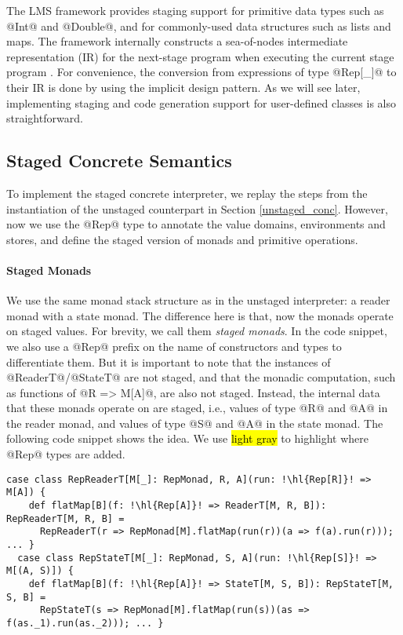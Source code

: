 The LMS framework provides staging support for primitive data types such as
@Int@ and @Double@, and for commonly-used data structures such as lists and
maps.  The framework internally constructs a sea-of-nodes intermediate
representation (IR) for the next-stage program when executing the current stage
program \cite{DBLP:conf/birthday/Rompf16}.
For convenience, the conversion from expressions of type @Rep[_]@ to their IR
is done by using the implicit design pattern. As we will see later,
implementing staging and code generation support for user-defined classes is
also straightforward.

\subsection{Staged Concrete Semantics}

To implement the staged concrete interpreter, we replay the steps from the
instantiation of the unstaged counterpart in Section \ref{unstaged_conc}.
However, now we use the @Rep@ type to annotate the value domains, environments and
stores, and define the staged version of monads and primitive operations.

\paragraph{Staged Monads}
We use the same monad stack structure as in the unstaged interpreter: a reader
monad with a state monad. The difference here is that, now the monads operate
on staged values.  For brevity, we call them \textit{staged monads}. In the
code snippet, we also use a @Rep@ prefix on the name of constructors and types
to differentiate them.
But it is important to note that the instances of @ReaderT@/@StateT@ are not
staged, and that the monadic computation, such as functions of @R => M[A]@, are
also not staged. Instead, the internal data that these monads operate on are
staged, i.e., values of type @R@ and @A@ in the reader monad, and values of type @S@ and
@A@ in the state monad.
The following code snippet shows the idea. We use \hl{light gray} to highlight
where @Rep@ types are added.
\begin{lstlisting}[escapechar=!]
  case class RepReaderT[M[_]: RepMonad, R, A](run: !\hl{Rep[R]}! => M[A]) {
    def flatMap[B](f: !\hl{Rep[A]}! => ReaderT[M, R, B]): RepReaderT[M, R, B] =
      RepReaderT(r => RepMonad[M].flatMap(run(r))(a => f(a).run(r))); ... }
  case class RepStateT[M[_]: RepMonad, S, A](run: !\hl{Rep[S]}! => M[(A, S)]) {
    def flatMap[B](f: !\hl{Rep[A]}! => StateT[M, S, B]): RepStateT[M, S, B] =
      RepStateT(s => RepMonad[M].flatMap(run(s))(as => f(as._1).run(as._2))); ... }
\end{lstlisting}


